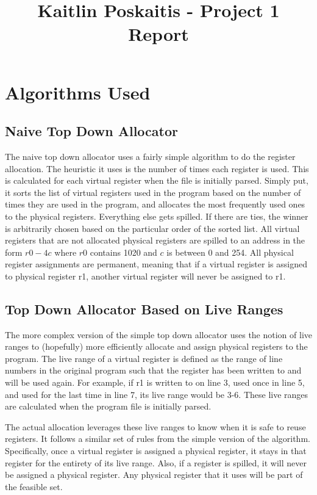 \documentclass[12pt]{article}
\title{\bf Kaitlin Poskaitis - Project 1 Report}
\author{}
\date{}
\begin{document}
\maketitle

\section*{Algorithms Used}

    \subsection{Naive Top Down Allocator}
    The naive top down allocator uses a fairly simple algorithm to do the
    register allocation. The heuristic it uses is the number of times each
    register is used. This is calculated for each virtual register when the file
    is initially parsed. Simply put, it sorts the list of virtual registers used
    in the program based on the number of times they are used in the program,
    and allocates the most frequently used ones to the physical registers.
    Everything else gets spilled. If there are ties, the winner is arbitrarily
    chosen based on the particular order of the sorted list. All virtual
    registers that are not allocated physical registers are spilled to an
    address in the form $r0 - 4c$ where $r0$ contains 1020 and $c$ is between 0
    and 254. All physical register assignments are permanent, meaning that
    if a virtual register is assigned to physical register r1, another virtual
    register will never be assigned to r1.

    \subsection{Top Down Allocator Based on Live Ranges}
    The more complex version of the simple top down allocator uses the notion of
    live ranges to (hopefully) more efficiently allocate and assign physical
    registers to the program. The live range of a virtual register is defined as
    the range of line numbers in the original program such that the register has
    been written to and will be used again. For example, if r1 is written to on
    line 3, used once in line 5, and used for the last time in line 7, its live
    range would be 3-6. These live ranges are calculated when the program file
    is initially parsed.

    The actual allocation leverages these live ranges to know when it is safe to
    reuse registers. It follows a similar set of rules from the simple version
    of the algorithm. Specifically, once a virtual register is assigned a
    physical register, it stays in that register for the entirety of its live
    range. Also, if a register is spilled, it will never be assigned a physical
    register. Any physical register that it uses will be part of the feasible
    set.
\end{document}
